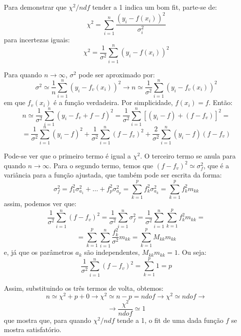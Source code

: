 \documentclass[14pt]{extarticle}
\begin{document}
\hspace*{0.5cm}

Para demonstrar que $\chi^{2}/ndf$ tender a 1 indica um bom fit, parte-se de: \large $$\chi^{2}=\sum_{i=1}^{n}\frac{(y_{i}-f(x_{i}))^{2}}{\sigma^{2}_{i}}$$\normalsize
para incertezas iguais:\large $$\chi^{2}=\frac{1}{\sigma^{2}}\sum_{i=1}^{n}(y_{i}-f(x_{i}))^{2}$$\normalsize

Para quando $n\to\infty$, $\sigma^{2}$ pode ser aproximado por:\large $$\sigma^{2}\simeq\frac{1}{n}\sum_{i=1}^{n}(y_{i}-f_{v}(x_{i}))^{2}\to n\simeq\frac{1}{\sigma^{2}}\sum_{i=1}^{n}(y_{i}-f_{v}(x_{i}))^{2}$$\normalsize em que $f_{v}(x_{i})$ é a função verdadeira. Por simplicidade, $f(x_{i})=f$. Então:\large $$n\simeq\frac{1}{\sigma^{2}}\sum_{i=1}^{n}(y_{i}-f_{v}+f-f)^{2}=\frac{1}{\sigma^{2}}\sum_{i=1}^{n}[(y_{i}-f)+(f-f_{v})]^{2}=$$
$$=\frac{1}{\sigma^{2}}\sum_{i=1}^{n}(y_{i}-f)^{2}+\frac{1}{\sigma^{2}}\sum_{i=1}^{n}(f-f_{v})^{2}+\frac{2}{\sigma^{2}}\sum_{i=1}^{n}(y_{i}-f)(f-f_{v})$$\normalsize

\vspace{1em}

Pode-se ver que o primeiro termo é igual a $\chi^{2}$. O terceiro termo se anula para quando $n\to\infty$. Para o segundo termo, temos que $(f-f_{v})^{2}\simeq \sigma^{2}_{f}$, que é a variância para a função ajustada, que também pode ser escrita da forma:\large $$\sigma^{2}_{f}=f^{2}_{1}\sigma^{2}_{a_{1}}+\ldots+f^{2}_{p}\sigma^{2}_{a_{p}}=\sum_{k=1}^{p}f_{k}^{2}\sigma^{2}_{a_{k}}=\sum^{p}_{k=1}f_{k}^{2}m_{kk}$$\normalsize
assim, podemos ver que:\large $$\frac{1}{\sigma^{2}}\sum_{i=1}^{n}(f-f_{v})^{2}=\frac{1}{\sigma^{2}}\sum_{i=1}^{n}\sigma^{2}_{f}=\frac{1}{\sigma^{2}}\sum_{i=1}^{n}\sum_{k=1}^{p}f_{k}^{2}m_{kk}=$$
$$=\sum_{k=1}^{p}\sum_{i=1}^{n}\frac{f^{2}_{k}}{\sigma^{2}}m_{kk}=\sum_{k=1}^{p}M_{kk}m_{kk}$$\normalsize
e, já que os parâmetros $a_{k}$ são independentes, $M_{kk}m_{kk}=1$. Ou seja:\large $$\frac{1}{\sigma^{2}}\sum_{i=1}^{n}(f-f_{v})^{2}=\sum_{k=1}^{p}1 = p$$\normalsize

Assim, substituindo os três termos de volta, obtemos:\large$$n\simeq\chi^{2}+p+0\to \chi^{2}\simeq n-p=ndof\to\chi^{2}\simeq ndof\to$$
$$\to\frac{\chi^{2}}{ndof}\simeq1$$\normalsize
que mostra que, para quando $\chi^{2}/ndf$ tende a 1, o fit de uma dada função $f$ se mostra satisfatório.
\end{document}

